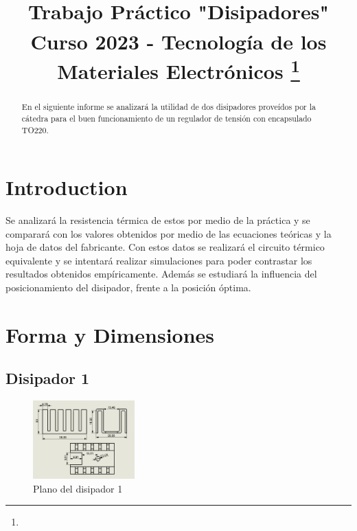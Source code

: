 \documentclass[conference]{IEEEtran}
\begin{document}
\title{Trabajo Práctico "Disipadores"\\
{\footnotesize \textsuperscript{}Curso 2023 - Tecnología de los Materiales Electrónicos}
\thanks{}
}

\author{
\and
{}
}

\maketitle


\begin{abstract}
En el siguiente informe se analizará la utilidad de dos disipadores proveídos por la cátedra
para el buen funcionamiento de un regulador de tensión con encapsulado TO220.
\end{abstract}

\section{Introduction}
Se analizará la resistencia térmica de estos por medio de la práctica y se comparará con los valores 
obtenidos por medio de las ecuaciones teóricas y la hoja de datos del fabricante. Con estos datos
se realizará el circuito térmico equivalente y se intentará realizar simulaciones para poder contrastar
los resultados obtenidos empíricamente. Además se estudiará la influencia del posicionamiento del disipador,
frente a la posición óptima.

\section{Forma y Dimensiones}
\subsection{Disipador 1}
\begin{figure}[h]
    \centering
    \includegraphics[width=0.35\textwidth]{PlanoRamiCompleto.png}
    \caption{Plano del disipador 1}
\end{figure}
\end{document}
